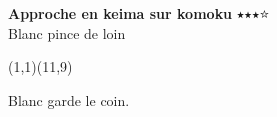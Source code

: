\documentclass[preview, border=0pt, varwidth=false]{standalone}
\begin{document}
	\setgounit{0.6cm} 
	
\parbox[c][14.65cm][c]{10.2cm}{
	\centering
	
	{\Large\textbf{Approche en keima sur komoku} 	$\medblackstar \medblackstar \medblackstar \medwhitestar$ \\ Blanc pince de loin}
	\vspace{3em}
	
	\begin{psgopartialboard}{(1,1)(11,9)}
		\pass
		\pass*
	\end{psgopartialboard}
	
	\vspace{1em}
	Blanc garde le coin.
	}
\end{document}
